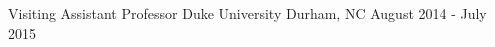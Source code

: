 


\begin{cventries}

  \cventry
    {Visiting Assistant Professor} %
    {Duke University} %
    {Durham, NC} %
    {August 2014 - July 2015} %
    {
    }

    
\end{cventries}
